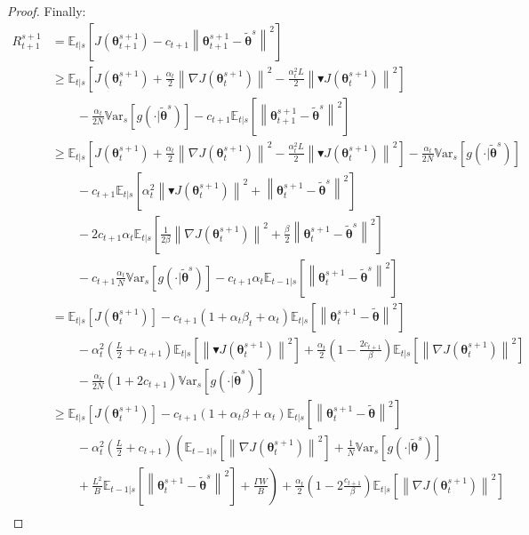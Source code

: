 \documentclass{article}
\theoremstyle{remark}
\theoremstyle{definition}
\newcommand{\norm}[2][\infty]{\left\|#2\right\|_{#1}}
\newcommand{\vtheta}{\boldsymbol{\theta}}
\newcommand{\gradJ}[1]{\nabla J(#1)}
\newcommand{\Ets}[2][t]{\mathbb{E}_{#1\vert s}\left[#2\right]}
\newcommand{\Vars}[1]{{\mathbb{V}\text{ar}}_{s}\left[#1\right]}
\newcommand{\gradBlack}[1]{\blacktriangledown J(#1)}
\begin{document}
\begin{proof}
Finally:
\begin{align}
	R_{t+1}^{s+1} &= \Ets{J(\vtheta_{t+1}^{s+1}) - c_{t+1}\norm[]{\vtheta_{t+1}^{s+1}-\tilde{\vtheta}^s}^2} \nonumber\\
	&\geq	\Ets{J(\vtheta_t^{s+1})+\frac{\alpha_t}{2}\norm[]{\gradJ{\vtheta_t^{s+1}}}^2 - \frac{\alpha_t^2L}{2}\norm[]{\gradBlack{\vtheta_t^{s+1}}}^2} \nonumber\\
	&\qquad-
	\frac{\alpha_t}{2N}\Vars{g(\cdot\vert\tilde{\vtheta}^s)}
	-c_{t+1}\Ets{\norm[]{\vtheta_{t+1}^{s+1}-\tilde{\vtheta}^s}^2} \label{eq:17}\\
	&\geq \Ets{J(\vtheta_t^{s+1})+\frac{\alpha_t}{2}\norm[]{\gradJ{\vtheta_t^{s+1}}}^2 - \frac{\alpha_t^2L}{2}\norm[]{\gradBlack{\vtheta_t^{s+1}}}^2} 
	-\frac{\alpha_t}{2N}\Vars{g(\cdot\vert\tilde{\vtheta}^s)} \nonumber\\
	&\qquad -c_{t+1}\Ets{\alpha_t^2\norm[]{\gradBlack{\vtheta_t^{s+1}}}^2+\norm[]{\vtheta_t^{s+1}-\tilde{\vtheta}^s}^2}
	\nonumber\\
	&\qquad-2c_{t+1}\alpha_t\Ets{\frac{1}{2\beta}\norm[]{\gradJ{\vtheta_t^{s+1}}}^2+\frac{\beta}{2}\norm[]{\vtheta_t^{s+1}-\tilde{\vtheta}^s}^2} \nonumber\\ 
	&\qquad
	-c_{t+1}\frac{\alpha_t}{N}\Vars{g(\cdot\vert\tilde{\vtheta}^s)} -c_{t+1}\alpha_t\Ets[t-1]{\norm[]{\vtheta_t^{s+1}-\tilde{\vtheta}^s}^2} \label{eq:18}\\
	&= \Ets{J(\vtheta_t^{s+1})} - c_{t+1}\left(1+\alpha_t\beta_t+\alpha_t\right)\Ets{\norm[]{\vtheta_{t}^{s+1}-\tilde{\vtheta}}^2} \nonumber\\
	&\qquad-\alpha_t^2\left(\frac{L}{2}+c_{t+1}\right)\Ets{\norm[]{\gradBlack{\vtheta_t^{s+1}}}^2}
	+\frac{\alpha_t}{2}\left(1-\frac{2c_{t+1}}{\beta}\right)\Ets{\norm[]{\gradJ{\vtheta_t^{s+1}}}^2} \nonumber\\
	&\qquad-\frac{\alpha_t}{2N}\left(1+2c_{t+1}\right)\Vars{g(\cdot\vert\tilde{\vtheta}^s)} \nonumber\\
	&\geq  \Ets{J(\vtheta_t^{s+1})} - c_{t+1}\left(1+\alpha_t\beta+\alpha_t\right)\Ets{\norm[]{\vtheta_{t}^{s+1}-\tilde{\vtheta}}^2} \nonumber\\
	&\qquad
	-\alpha_t^2\left(\frac{L}{2}+c_{t+1}\right)\left(\Ets[t-1]{\norm[]{\gradJ{\vtheta_t^{s+1}}}^2} 
	+\frac{1}{N}\Vars{g(\cdot\vert\tilde{\vtheta}^s)}
	\right.\nonumber\\
	&\left.\qquad+\frac{L^2}{B}\Ets[t-1]{\norm[]{\vtheta_t^{s+1}-\tilde{\vtheta}^s}^2}
	+\frac{\Gamma W}{B}\right)
	+\frac{\alpha_t}{2}\left(1-2\frac{c_{t+1}}{\beta}\right)\Ets{\norm[]{\gradJ{\vtheta_t^{s+1}}}^2} \nonumber\\

\end{align}
\end{proof}
\end{document}
